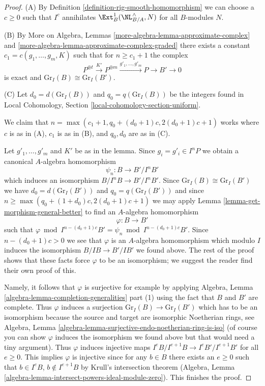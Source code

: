 \begin{proof}
(A) By Definition \ref{definition-rig-smooth-homomorphism}
we can choose a $c \geq 0$ such that $I^c$ annihilates
$\Ext^1_B(\NL_{B/A}^\wedge, N)$ for all $B$-modules $N$.

\medskip\noindent
(B) By More on Algebra, Lemmas \ref{more-algebra-lemma-approximate-complex} and
\ref{more-algebra-lemma-approximate-complex-graded}
there exists a constant $c_1 = c(g_1, \ldots, g_m, K)$
such that for $n \geq c_1 + 1$ the complex
$$
P^{\oplus t} \xrightarrow{K'} P^{\oplus m}
\xrightarrow{g'_1, \ldots, g'_m} P \to B' \to 0
$$
is exact and $\text{Gr}_I(B) \cong \text{Gr}_I(B')$.

\medskip\noindent
(C) Let $d_0 = d(\text{Gr}_I(B))$ and $q_0 = q(\text{Gr}_I(B))$
be the integers found in
Local Cohomology, Section \ref{local-cohomology-section-uniform}.

\medskip\noindent
We claim that $n = \max(c_1 + 1, q_0 + (d_0 + 1)c, 2(d_0 + 1)c + 1)$
works where $c$ is as in (A), $c_1$ is as in (B), and $q_0, d_0$ are as
in (C).

\medskip\noindent
Let $g'_1, \ldots, g'_m$ and $K'$ be as in the lemma.
Since $g_i = g'_i \in I^nP$ we obtain a canonical
$A$-algebra homomorphism
$$
\psi_n : B \longrightarrow B'/I^nB'
$$
which induces an isomorphism $B/I^nB \to B'/I^nB'$. Since
$\text{Gr}_I(B) \cong \text{Gr}_I(B')$ we have
$d_0 = d(\text{Gr}_I(B'))$ and $q_0 = q(\text{Gr}_I(B'))$
and since $n \geq \max(q_0 + (1 + d_0)c, 2(d_0 + 1)c + 1)$
we may apply Lemma \ref{lemma-get-morphism-general-better}
to find an $A$-algebra homomorphism
$$
\varphi : B \longrightarrow B'
$$
such that
$\varphi \bmod I^{n - (d_0 + 1)c}B' = \psi_n \bmod I^{n - (d_0 + 1)c}B'$.
Since $n - (d_0 + 1)c > 0$ we see that $\varphi$ is an $A$-algebra
homomorphism which modulo $I$ induces the isomorphism $B/IB \to B'/IB'$
we found above.
The rest of the proof shows that these facts force $\varphi$
to be an isomorphism; we suggest the reader find their own proof of this.

\medskip\noindent
Namely, it follows that $\varphi$ is surjective for example by applying
Algebra, Lemma \ref{algebra-lemma-completion-generalities} part (1)
using the fact that $B$ and $B'$ are complete.
Thus $\varphi$ induces a surjection $\text{Gr}_I(B) \to \text{Gr}_I(B')$
which has to be an isomorphism because the source and target are
isomorphic Noetherian rings, see
Algebra, Lemma \ref{algebra-lemma-surjective-endo-noetherian-ring-is-iso}
(of course you can show $\varphi$ induces the isomorphism we found above
but that would need a tiny argument).
Thus $\varphi$ induces injective maps
$I^eB/I^{e + 1}B \to I^eB'/I^{e + 1}B'$ for all $e \geq 0$.
This implies $\varphi$ is injective since for any $b \in B$ there
exists an $e \geq 0$ such that $b \in I^eB$, $b \not \in I^{e + 1}B$
by Krull's intersection theorem (Algebra, Lemma
\ref{algebra-lemma-intersect-powers-ideal-module-zero}).
This finishes the proof.
\end{proof}

